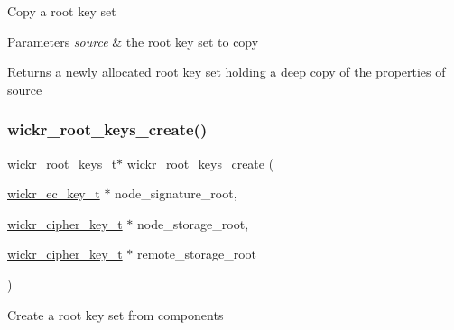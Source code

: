 Copy a root key set


\begin{DoxyParams}{Parameters}
{\em source} & the root key set to copy \\
\hline
\end{DoxyParams}
\begin{DoxyReturn}{Returns}
a newly allocated root key set holding a deep copy of the properties of \textquotesingle{}source\textquotesingle{} 
\end{DoxyReturn}
\mbox{\label{group__wickr__root__keys_gab6289774ce4bcbdc08584695f9b7c34c}} 
\subsubsection{\texorpdfstring{wickr\+\_\+root\+\_\+keys\+\_\+create()}{wickr\_root\_keys\_create()}}
{\footnotesize\ttfamily \mbox{\hyperlink{structwickr__root__keys}{wickr\+\_\+root\+\_\+keys\+\_\+t}}$\ast$ wickr\+\_\+root\+\_\+keys\+\_\+create (\begin{DoxyParamCaption}\item[{\mbox{\hyperlink{structwickr__ec__key}{wickr\+\_\+ec\+\_\+key\+\_\+t}} $\ast$}]{node\+\_\+signature\+\_\+root,  }\item[{\mbox{\hyperlink{structwickr__cipher__key}{wickr\+\_\+cipher\+\_\+key\+\_\+t}} $\ast$}]{node\+\_\+storage\+\_\+root,  }\item[{\mbox{\hyperlink{structwickr__cipher__key}{wickr\+\_\+cipher\+\_\+key\+\_\+t}} $\ast$}]{remote\+\_\+storage\+\_\+root }\end{DoxyParamCaption})}

Create a root key set from components


